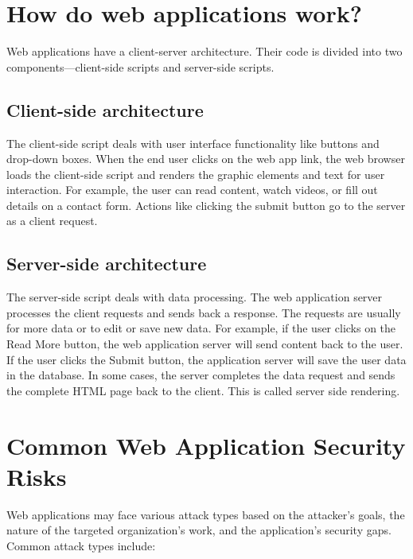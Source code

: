 \documentclass[conference]{IEEEtran}
\begin{document}
\section{How do web applications work?}
Web applications have a client-server architecture. Their code is divided into two components—client-side scripts and server-side scripts.  

\subsection{Client-side architecture}
The client-side script deals with user interface functionality like buttons and drop-down boxes. When the end user clicks on the web app link, the web browser loads the client-side script and renders the graphic elements and text for user interaction. For example, the user can read content, watch videos, or fill out details on a contact form. Actions like clicking the submit button go to the server as a client request.

\subsection{Server-side architecture}
The server-side script deals with data processing. The web application server processes the client requests and sends back a response. The requests are usually for more data or to edit or save new data. For example, if the user clicks on the Read More button, the web application server will send content back to the user. If the user clicks the Submit button, the application server will save the user data in the database. In some cases, the server completes the data request and sends the complete HTML page back to the client. This is called server side rendering.


\section{Common Web Application Security Risks}
Web applications may face various attack types based on the attacker’s goals, the nature of the targeted organization’s work, and the application’s security gaps. Common attack types include:
\end{document}
